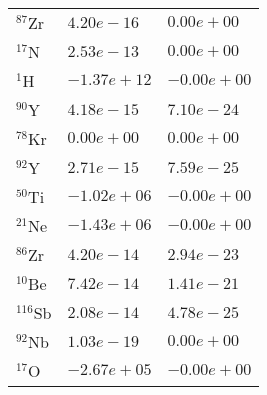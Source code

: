 \begin{tabular}{lll}
 $^{87}$Zr  & $4.20e-16 $                                                        & $0.00e+00 $                                                                     \\
 $^{17}$N   & $2.53e-13 $                                                        & $0.00e+00 $                                                                     \\
 $^{1}$H    & $-1.37e+12 $                                                       & $-0.00e+00 $                                                                    \\
 $^{90}$Y   & $4.18e-15 $                                                        & $7.10e-24 $                                                                     \\
 $^{78}$Kr  & $0.00e+00 $                                                        & $0.00e+00 $                                                                     \\
 $^{92}$Y   & $2.71e-15 $                                                        & $7.59e-25 $                                                                     \\
 $^{50}$Ti  & $-1.02e+06 $                                                       & $-0.00e+00 $                                                                    \\
 $^{21}$Ne  & $-1.43e+06 $                                                       & $-0.00e+00 $                                                                    \\
 $^{86}$Zr  & $4.20e-14 $                                                        & $2.94e-23 $                                                                     \\
 $^{10}$Be  & $7.42e-14 $                                                        & $1.41e-21 $                                                                     \\
 $^{116}$Sb & $2.08e-14 $                                                        & $4.78e-25 $                                                                     \\
 $^{92}$Nb  & $1.03e-19 $                                                        & $0.00e+00 $                                                                     \\
 $^{17}$O   & $-2.67e+05 $                                                       & $-0.00e+00 $                                                                    \\

\end{tabular}
